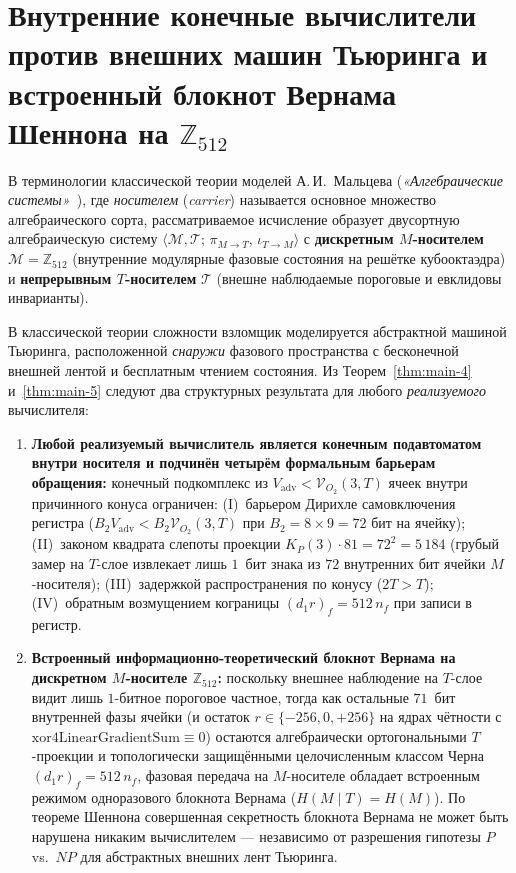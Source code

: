 \documentclass[11pt,a4paper]{article}
\theoremstyle{plain}
\theoremstyle{definition}
\begin{document}
\section{Внутренние конечные вычислители против внешних машин Тьюринга и встроенный блокнот Вернама Шеннона на \texorpdfstring{$\mathbb{Z}_{512}$}{Z512}}
\label{sec:embedded-adversary-vernam}

В терминологии классической теории моделей А.\,И.~Мальцева (\emph{«Алгебраические системы»}~\cite{Malcev1970}), где \emph{носителем} (\emph{carrier}) называется основное множество алгебраического сорта, рассматриваемое исчисление образует двусортную алгебраическую систему $\langle\mathcal{M},\mathcal{T};\,\pi_{M\to T},\,\iota_{T\to M}\rangle$ с \textbf{дискретным $M$-носителем} $\mathcal{M}=\mathbb{Z}_{512}$ (внутренние модулярные фазовые состояния на решётке кубооктаэдра) и \textbf{непрерывным $T$-носителем} $\mathcal{T}$ (внешне наблюдаемые пороговые и евклидовы инварианты).

В классической теории сложности взломщик моделируется абстрактной машиной Тьюринга, расположенной \emph{снаружи} фазового пространства с бесконечной внешней лентой и бесплатным чтением состояния. Из Теорем~\ref{thm:main-4} и~\ref{thm:main-5} следуют два структурных результата для любого \emph{реализуемого} вычислителя:
\begin{enumerate}[label=\textbf{(\arabic*)},leftmargin=*]
\item \textbf{Любой реализуемый вычислитель является конечным подавтоматом внутри носителя и подчинён четырём формальным барьерам обращения:}
  конечный подкомплекс из $V_{\mathrm{adv}} < \mathcal{V}_{O_2}(3,T)$ ячеек внутри причинного конуса ограничен:
  (I)~барьером Дирихле самовключения регистра ($B_2 V_{\mathrm{adv}} < B_2\mathcal{V}_{O_2}(3,T)$ при $B_2 = 8\times 9 = 72$ бит на ячейку);
  (II)~законом квадрата слепоты проекции $K_P(3)\cdot 81 = 72^2 = 5\,184$ (грубый замер на $T$-слое извлекает лишь $1$~бит знака из $72$ внутренних бит ячейки $M$-носителя);
  (III)~задержкой распространения по конусу ($2T > T$);
  (IV)~обратным возмущением кограницы $(d_1 r)_f = 512\,n_f$ при записи в регистр.
\item \textbf{Встроенный информационно-теоретический блокнот Вернама на дискретном $M$-носителе $\mathbb{Z}_{512}$:}
  поскольку внешнее наблюдение на $T$-слое видит лишь $1$-битное пороговое частное, тогда как остальные $71$~бит внутренней фазы ячейки (и остаток $r\in\{-256,0,+256\}$ на ядрах чётности с $\mathrm{xor4LinearGradientSum}\equiv 0$) остаются алгебраически ортогональными $T$-проекции и топологически защищёнными целочисленным классом Черна $(d_1 r)_f = 512\,n_f$, фазовая передача на $M$-носителе обладает встроенным режимом одноразового блокнота Вернама ($H(M\mid T) = H(M)$). По теореме Шеннона совершенная секретность блокнота Вернама не может быть нарушена никаким вычислителем --- независимо от разрешения гипотезы $P$ vs.\ $NP$ для абстрактных внешних лент Тьюринга.
\end{enumerate}
\end{document}
